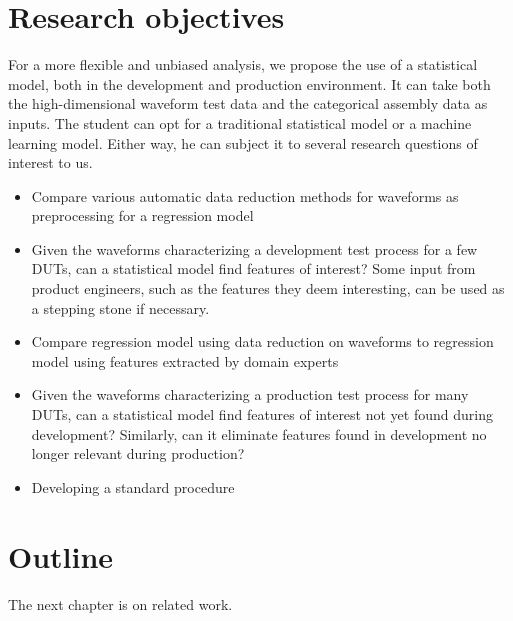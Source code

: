 \section{Research objectives}

For a more flexible and unbiased analysis, we propose the use of a statistical model, both in the development
and production environment. It can take both the high-dimensional waveform test data and the categorical
assembly data as inputs. The student can opt for a traditional statistical model or a machine learning model.
Either way, he can subject it to several research questions of interest to us.

\begin{itemize}
      \item Compare various automatic data reduction methods for waveforms as
            preprocessing for a regression model
      \item Given the waveforms characterizing a development test process for a few DUTs, can a statistical
            model find features of interest? Some input from product engineers, such as the features they deem
            interesting, can be used as a stepping stone if necessary.
      \item Compare regression model using data reduction on waveforms to
            regression model using features extracted by domain experts
      \item Given the waveforms characterizing a production test process for many DUTs, can a statistical model
            find features of interest not yet found during development? Similarly, can it eliminate features found
            in development no longer relevant during production?
      \item Developing a standard procedure
\end{itemize}

\section{Outline}

The next chapter is on related work.
